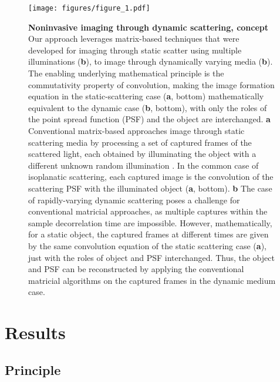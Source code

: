 \documentclass[pdflatex,sn-mathphys-num]{sn-jnl}%
\theoremstyle{thmstyleone}%
\theoremstyle{thmstyletwo}%
\theoremstyle{thmstylethree}%
\begin{document}
\begin{figure}[hbt!]
	\centering
	\texttt{[image: figures/figure\_1.pdf]}
    \caption{\textbf{Noninvasive imaging through dynamic scattering, concept }
    Our approach leverages matrix-based techniques that were developed for imaging through static scatter using multiple illuminations (\textbf{b}), to image through dynamically varying media (\textbf{b}). The enabling underlying mathematical principle is the commutativity property of convolution, making the image formation equation in the static-scattering case (\textbf{a}, bottom) mathematically equivalent to the dynamic case (\textbf{b}, bottom), with only the roles of the point spread function (PSF) and the object are interchanged.
    \textbf{a} Conventional matrix-based approaches image through static scattering media by processing a set of captured frames of the scattered light, each obtained by illuminating the object with a different unknown random illumination \cite{lee22, weinberg2023noninvasive}. In the common case of isoplanatic scattering, each captured image is the convolution of the scattering PSF with the illuminated object (\textbf{a}, bottom). 
    \textbf{b} The case of rapidly-varying dynamic scattering poses a challenge for conventional matricial approaches, as multiple captures within the sample decorrelation time are impossible. However, mathematically, for a static object, the captured frames at different times are given by the same convolution equation of the static scattering case (\textbf{a}), just with the roles of object and PSF interchanged. Thus, the object and PSF can be reconstructed by applying the conventional matricial algorithms  \cite{lee22, weinberg2023noninvasive,kang2024implementation} on the captured frames in the dynamic medium case. %
    }
    \label{fig1}
    \end{figure} 

\section*{Results}
\subsection*{Principle}
\end{document}
